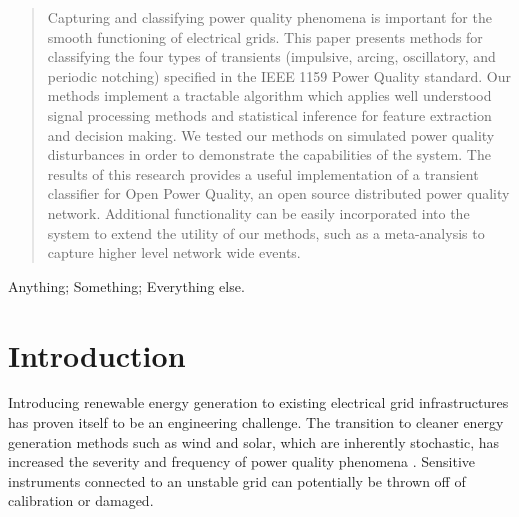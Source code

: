 \documentclass[10pt, conference, compsocconf]{IEEEtran}
\begin{document}




\maketitle


\begin{abstract}

Capturing and classifying power quality phenomena is important for the smooth functioning of electrical grids.  This paper presents methods for classifying the four types of transients (impulsive, arcing, oscillatory, and periodic notching) specified in the IEEE 1159 Power Quality standard. Our methods implement a tractable algorithm which applies well understood signal processing methods and statistical inference for feature extraction and decision making. We tested our methods on simulated power quality disturbances in order to demonstrate the capabilities of the system. The results of this research provides a useful implementation of a transient classifier for Open Power Quality, an open source distributed power quality network. Additional functionality can be easily incorporated into the system to extend the utility of our methods, such as a meta-analysis to capture higher level network wide events.

\end{abstract}

\begin{IEEEkeywords}
Anything; Something; Everything else.%
\end{IEEEkeywords}



%
\IEEEpeerreviewmaketitle



\section{Introduction}

Introducing renewable energy generation to existing electrical grid infrastructures has proven itself to be an engineering challenge. The transition to cleaner energy generation methods such as wind and solar, which are inherently stochastic, has increased the severity and frequency of power quality phenomena \cite{Radu:2014:RenewableImpacts}. Sensitive instruments connected to an unstable grid can potentially be thrown off of calibration or damaged.
\end{document}
